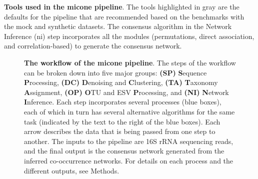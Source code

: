 \documentclass[letterpaper,12pt]{article}
\begin{document}

  \begin{table}[H]
    \centering
    \caption{
      \textbf{Tools used in the \ac{micone} pipeline}.
      The tools highlighted in gray are the defaults for the pipeline that are recommended based on the benchmarks with the mock and synthetic datasets.
      The consensus algorithm in the Network Inference (\ac{ni}) step incorporates all the modules (permutations, direct association, and correlation-based) to generate the consensus network.
    }
    \label{tab:micone_tools}
  \end{table}


  \begin{figure}[H]
    \centering
    \caption{
      \textbf{The workflow of the \ac{micone} pipeline}.
      The steps of the workflow can be broken down into five major groups: \textbf{(SP)} \textbf{S}equence \textbf{P}rocessing, \textbf{(DC)} \textbf{D}enoising and \textbf{C}lustering, \textbf{(TA)} \textbf{T}axonomy \textbf{A}ssignment, \textbf{(OP)} \textbf{O}TU and ESV \textbf{P}rocessing, and \textbf{(NI)} \textbf{N}etwork \textbf{I}nference.
      Each step incorporates several processes (blue boxes), each of which in turn has several alternative algorithms for the same task (indicated by the text to the right of the blue boxes).
      Each arrow describes the data that is being passed from one step to another.
      The inputs to the pipeline are 16S rRNA sequencing reads, and the final output is the consensus network generated from the inferred co-occurrence networks.
      For details on each process and the different outputs, see Methods.
    }
    \label{fig:figure1}
  \end{figure}
\end{document}
